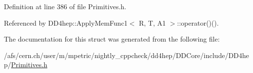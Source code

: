 Definition at line 386 of file Primitives.h.

Referenced by DD4hep::ApplyMemFunc1$<$ R, T, A1 $>$::operator()().

The documentation for this struct was generated from the following file:\begin{DoxyCompactItemize}
\item 
/afs/cern.ch/user/m/mpetric/nightly\_\-cppcheck/dd4hep/DDCore/include/DD4hep/\hyperlink{_primitives_8h}{Primitives.h}\end{DoxyCompactItemize}
